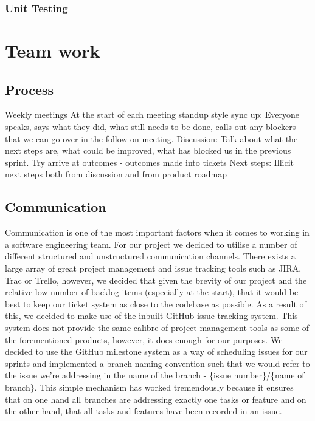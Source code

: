 \documentclass{article}
\begin{document}
	\subsubsection{Unit Testing}
	
	\section{Team work}
	
	
	\subsection{Process}
	Weekly meetings
	At the start of each meeting standup style sync up:
	Everyone speaks, says what they did, what still needs to be done, calls out any blockers that we can go over in the follow on meeting.
	Discussion: 
	Talk about what the next steps are, what could be improved, what has blocked us in the previous sprint. Try arrive at outcomes - outcomes made into tickets
	Next steps:
	Illicit next steps both from discussion and from product roadmap
	
	
	\subsection{Communication}
	
	Communication is one of the most important factors when it comes to working in a software engineering team. For our project we decided to utilise a number of different structured and unstructured communication channels. There exists a large array of great project management and issue tracking tools such as JIRA, Trac or Trello, however, we decided that given the brevity of our project and the relative low number of backlog items (especially at the start), that it would be best to keep our ticket system as close to the codebase as possible. As a result of this, we decided to make use of the inbuilt GitHub issue tracking system. This system does not provide the same calibre of project management tools as some of the forementioned products, however, it does enough for our purposes. We decided to use the GitHub milestone system as a way of scheduling issues for our sprints and implemented a branch naming convention such that we would refer to the issue we're addressing in the name of the branch - \{issue number\}/\{name of branch\}. This simple mechanism has worked tremendously because it ensures that on one hand all branches are addressing exactly one tasks or feature and on the other hand, that all tasks and features have been recorded in an issue. 
	
\end{document}

